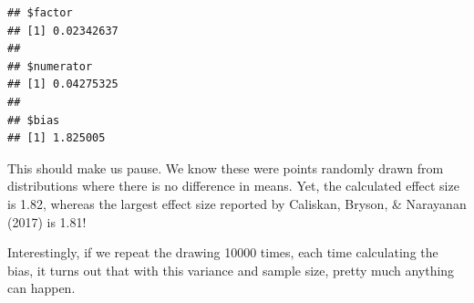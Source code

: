 \documentclass[
  10pt,
  dvipsnames,enabledeprecatedfontcommands]{scrartcl}
\begin{document}
\begin{verbatim}
## $factor
## [1] 0.02342637
## 
## $numerator
## [1] 0.04275325
## 
## $bias
## [1] 1.825005
\end{verbatim}

\normalsize

\noindent This should make us pause. We know these were points randomly
drawn from distributions where there is no difference in means. Yet, the
calculated effect size is 1.82, whereas the largest effect size reported
by Caliskan, Bryson, \& Narayanan (2017) is 1.81!

Interestingly, if we repeat the drawing 10000 times, each time
calculating the bias, it turns out that with this variance and sample
size, pretty much anything can happen.

\vspace{1mm}
\footnotesize
\end{document}
